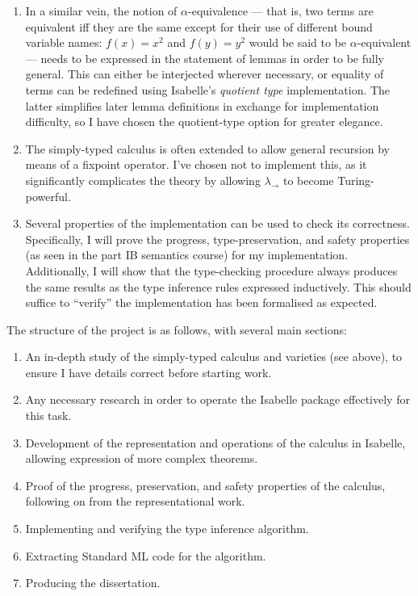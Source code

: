 \documentclass[12pt]{article}
\begin{document}
\begin{enumerate}
\item
In a similar vein, the notion of \(\alpha\)-equivalence --- that is, two terms are equivalent iff they are the same except for their use of different bound variable names: \(f(x) = x^2\) and \(f(y) = y^2\) would be said to be \(\alpha\)-equivalent --- needs to be expressed in the statement of lemmas in order to be fully general.
This can either be interjected wherever necessary, or equality of terms can be redefined using Isabelle's \emph{quotient type} implementation.
The latter simplifies later lemma definitions in exchange for implementation difficulty, so I have chosen the quotient-type option for greater elegance.
\item
The simply-typed calculus is often extended to allow general recursion by means of a fixpoint operator.
I've chosen not to implement this, as it significantly complicates the theory by allowing \(\lambda_\to\) to become Turing-powerful.
\item
Several properties of the implementation can be used to check its correctness.
Specifically, I will prove the progress, type-preservation, and safety properties (as seen in the part IB semantics course) for my implementation.
Additionally, I will show that the type-checking procedure always produces the same results as the type inference rules expressed inductively.
This should suffice to ``verify'' the implementation has been formalised as expected.
\end{enumerate}

The structure of the project is as follows, with several main sections:
\begin{enumerate}
\item
An in-depth study of the simply-typed calculus and varieties (see above), to ensure I have details correct before starting work.
\item
Any necessary research in order to operate the Isabelle package effectively for this task.
\item
Development of the representation and operations of the calculus in Isabelle, allowing expression of more complex theorems.
\item
Proof of the progress, preservation, and safety properties of the calculus, following on from the representational work.
\item
Implementing and verifying the type inference algorithm.
\item
Extracting Standard ML code for the algorithm.
\item
Producing the dissertation.
\end{enumerate}
\end{document}
